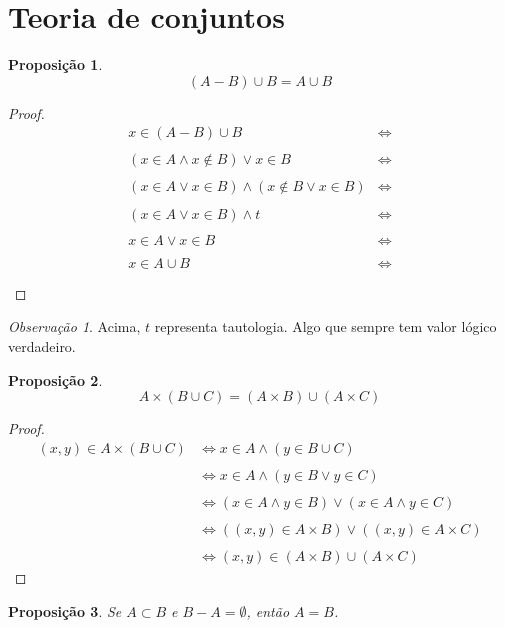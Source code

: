 \documentclass{article}
\theoremstyle{plain}
\newtheorem{prop}{Proposição}[section]
\theoremstyle{definition}
\theoremstyle{remark}
\newtheorem{obs}{Observação}[section]
\begin{document}
\section{Teoria de conjuntos}
\begin{prop}
	$$(A-B)\cup B =  A\cup B$$
\end{prop}
\begin{proof}
	\begin{align*}
		x\in (A-B)\cup B &\iff \\~\\
		(x\in A \land x \not \in B) \lor x\in B &\iff \\~\\
		(x\in A\lor x\in B)  \land( x \not \in B \lor x\in B) &\iff \\~\\
		(x\in A\lor x\in B)  \land t &\iff \\~\\
		x\in A\lor x\in B &\iff \\~\\
		x \in A \cup B  &\iff \\~\\
	\end{align*}
\end{proof}
\begin{obs}
	Acima, $t$ representa tautologia.  Algo que sempre tem valor lógico verdadeiro.
\end{obs}
\begin{prop}
	$$A\times (B\cup C ) = (A\times B )\cup( A\times C)$$
\end{prop}
\begin{proof}
	\begin{align*}
		(x,y) \in A\times (B\cup C ) & \iff 
		x\in A \land (y\in B\cup C)  \\~\\ &\iff 
		x\in A \land (y\in B\lor y\in  C)  \\~\\& \iff
		(x\in A \land y\in B) \lor (x\in A \land y\in  C)  \\~\\& \iff
		((x,y)\in A\times B) \lor  ((x,y)\in  A\times C) \\~\\ & \iff
		(x,y)\in (A\times B) \cup  (A\times C)
	\end{align*}
\end{proof}
\begin{prop}
	Se $A\subset B$ e $B-A = \emptyset$, então $A = B$.
\end{prop}
\end{document}
